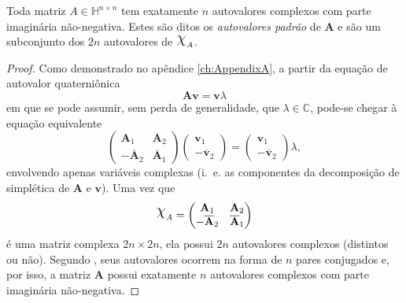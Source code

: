\begin{theorem}
\label{th:02}
Toda matriz $ A \in \mathbb{H}^{n \times n} $ tem exatamente $ n $ autovalores complexos
com parte imagin\'aria n\~ao-negativa. Estes s\~ao ditos os \emph{autovalores padr\~ao} de $ \mathbf{A} $ e s\~ao um subconjunto dos $ 2n $ autovalores de $ \rchi_A $.
\end{theorem}

\begin{proof}
Como demonstrado no ap\^endice \ref{ch:AppendixA}, a partir da equa\c c\~ao de autovalor quaterni\^onica
\begin{equation}
\mathbf{A} \mathbf{v} = \mathbf{v} \lambda
\end{equation}
em que se pode assumir, sem perda de generalidade, que $ \lambda \in \mathbb{C} $, pode-se chegar \`a equa\c c\~ao equivalente
\begin{equation}
\label{eq:eigvalueequation}
\begin{pmatrix}
\mathbf{A}_1 & \mathbf{A}_2\\ 
- \overline{\mathbf{A}}_2 & \overline{\mathbf{A}}_1
\end{pmatrix}
\begin{pmatrix}
\mathbf{v}_1 \\ 
- \overline{\mathbf{v}}_2
\end{pmatrix} =
\begin{pmatrix}
\mathbf{v}_1 \\ 
- \overline{\mathbf{v}}_2
\end{pmatrix}
\lambda,
\end{equation}
envolvendo apenas vari\'aveis complexas (i.~e. as componentes da decomposi\c c\~ao de simpl\'etica de $ \mathbf{A} $ e $ \mathbf{v} $). Uma vez que
\begin{equation}
\rchi_A = 
\begin{pmatrix}
\mathbf{A}_1 & \mathbf{A}_2\\ 
- \overline{\mathbf{A}}_2 & \overline{\mathbf{A}}_1
\end{pmatrix}
\end{equation}
\'e uma matriz complexa $ 2n \times 2n $, ela possui $ 2n $ autovalores complexos (distintos ou não). Segundo \cite[Teorema 5]{lee1948eigenvalues}, seus autovalores ocorrem na forma de $ n $ pares conjugados e, por isso, a matriz $ \mathbf{A} $ possui exatamente $ n $ autovalores complexos com parte imagin\'aria n\~ao-negativa.


\end{proof}
